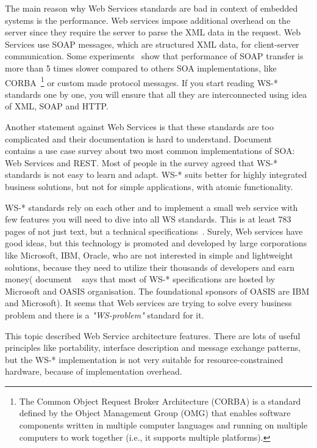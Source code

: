 The main reason why Web Services standards are bad in context of embedded
systems is the performance.
Web services impose additional overhead on the server since they require the
server to parse the XML data in the request. Web Services use SOAP
messages, which are structured XML data, for client-server communication.
Some experiments~\cite{1182978, 5470528} show that performance of SOAP transfer
is more than 5 times slower compared to others SOA implementations, like
CORBA~\footnote{The Common Object Request Broker Architecture (CORBA) is a
standard defined by the Object Management Group (OMG) that enables software
components written in multiple computer languages and running on multiple
computers to work together (i.e., it supports multiple
platforms).\cite{wikipedia:CORBA}} or custom made protocol messages. If you
start reading WS-* standards one by one, you will ensure that all they are
interconnected using idea of XML, SOAP and HTTP. 


Another statement against Web Services is that these standards are too
complicated and their documentation is hard to
understand. Document ~\cite{dguinard-rest-vs-ws} contains a use case survey
about two most common implementations of SOA: Web Services and REST. Most of people
in the survey agreed that WS-* standards is not easy to learn and adapt. WS-*
suits better for highly integrated business solutions, but not for simple
applications, with atomic functionality.

WS-* standards rely on each other and to implement a small web service with
few features you will need to dive into all WS standards. This is at least 783
pages of not just text, but a technical specifications~\cite{ws_pagecount}.
Surely, Web services have good ideas, but this technology is promoted and
developed by large corporations like Microsoft, IBM, Oracle, who are not
interested in simple and lightweight solutions, because they need to utilize
their thousands of developers and earn money( document ~\cite{ws_pagecount} says
that most of WS-* specifications are hosted by Microsoft and  OASIS
organisation. The foundational sponsors of OASIS are IBM and Microsoft).
It seems that Web services are trying to solve every business problem and there
is a \textit{"WS-problem"} standard for it.


This topic described Web Service architecture features. There are lots of
useful principles like portability, interface description and message exchange
patterns, but the WS-* implementation is not very suitable for resource-constrained
hardware, because of implementation overhead.





